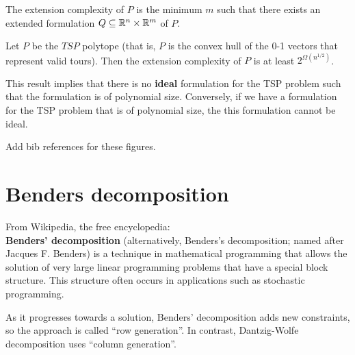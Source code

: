 \documentclass[../open-optimization/open-optimization.tex]{subfiles}
\begin{document}
\begin{definition} The extension complexity of $P$ is the minimum $m$ such that there exists an extended formulation $Q\subseteq {\mathbb{R}}^n\times {\mathbb{R}}^m$ of $P$.
\end{definition}

\begin{theorem} Let $P$ be the $TSP$ polytope (that is, $P$ is the convex hull of the 0-1 vectors that represent valid tours). Then the extension complexity of $P$ is at least $2^{\Omega(n^{1/2})}$.
\end{theorem}

\begin{remark}
This result implies that there is no {\bf ideal} formulation for the TSP problem such that the formulation is of polynomial size. Conversely, if we have a formulation for the TSP problem that is of polynomial size, the this formulation cannot be ideal.
\end{remark}


\begin{todo}
Add bib references for these figures.
\end{todo}






\section{Benders decomposition} 

From Wikipedia, the free encyclopedia:\\

{\bf Benders' decomposition} (alternatively, Benders's decomposition; named after Jacques F. Benders) is a technique in mathematical programming that allows the solution of very large linear programming problems that have a special block structure. This structure often occurs in applications such as stochastic programming.

As it progresses towards a solution, Benders' decomposition adds new constraints, so the approach is called ``row generation''. In contrast, Dantzig-Wolfe decomposition uses ``column generation''.
\end{document}

